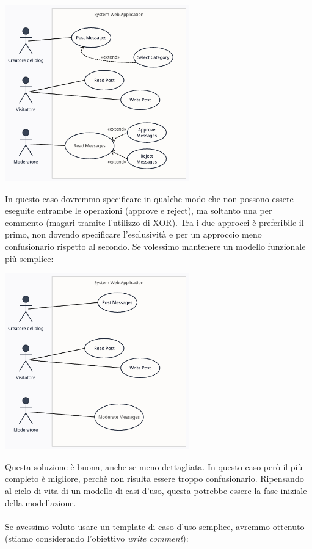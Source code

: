 \documentclass{article}
\begin{document}
\begin{center}
    \includegraphics[width=0.6\textwidth]{foto 7.png}
\end{center}
In questo caso dovremmo specificare in qualche modo che non possono essere eseguite entrambe le operazioni (approve e reject), ma soltanto una per commento (magari tramite l'utilizzo di XOR). Tra i due approcci è preferibile il primo, non dovendo specificare l'esclusività e per un approccio meno confusionario rispetto al secondo.
Se volessimo mantenere un modello funzionale più semplice:
\begin{center}
    \includegraphics[width=0.6\textwidth]{foto 8.png}
\end{center}
Questa soluzione è buona, anche se meno dettagliata. In questo caso però il più completo è migliore, perchè non risulta essere troppo confusionario. Ripensando al ciclo di vita di un modello di casi d'uso, questa potrebbe essere la fase iniziale della modellazione.\\ \\
Se avessimo voluto usare un template di caso d'uso semplice, avremmo ottenuto (stiamo considerando l'obiettivo \textit{write comment}):
\end{document}
